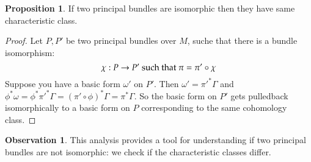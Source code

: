 \documentclass[12pt,a4paper]{report}
\theoremstyle{definition}
\theoremstyle{Theorem}
\newtheorem{Prop}[Def]{Proposition}
\theoremstyle{break}
\theoremstyle{definition}
\newtheorem{Obs}[Def]{Observation}
\begin{document}
		\begin{Prop}
			If two principal bundles are isomorphic then they have same characteristic class.
		\end{Prop}
		\begin{proof}
			Let $P,P'$ be two principal bundles over $M$, suche that there is a bundle isomorphism:
			$$\chi:P\rightarrow P'\hbox{ such that }\pi=\pi'\circ \chi$$
			Suppose you have a basic form $\omega'$ on $P'$. Then $\omega'=\pi'^*\Gamma$ and $\phi^*\omega=\phi^*\pi'^*\Gamma=(\pi'\circ \phi)^*\Gamma=\pi^*\Gamma$. So the basic form on $P'$ gets pulledback isomorphically to a basic form on $P$ corresponding to the same cohomology class.
		\end{proof}
		\begin{Obs}
			This analysis provides a tool for understanding if two principal bundles are not isomorphic: we check if the characteristic classes differ. 
		\end{Obs}
\end{document}
